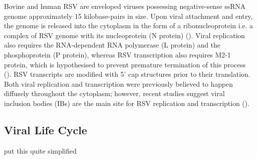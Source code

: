 Bovine and human RSV are enveloped viruses possessing negative-sense ssRNA genome approximately 15 kilobase-pairs in size. Upon viral attachment and entry, the genome is released into the cytoplasm in the form of a ribonucleoprotein i.e. a complex of RSV genome with its nucleoprotein (N protein) (\cite{Noton2015InitiationReplication}). Viral replication also requires the RNA-dependent RNA polymerase (L protein) and the phosphoprotein (P protein), whereas RSV transcription also requires M2-1 protein, which is hypothesised to prevent premature termination of this process (\cite{Tanner2014CrystalPhosphorylation}). RSV transcripts are modified with 5’ cap structures prior to their translation. Both viral replication and transcription were previously believed to happen diffusely throughout the cytoplasm; however, recent studies suggest viral inclusion bodies (IBs) are the main site for RSV replication and transcription (\cite{Rincheval2017FunctionalVirus}). 

\subsection{Viral Life Cycle} \label{subsec:Viral Life Cycle}
put this quite simplified

